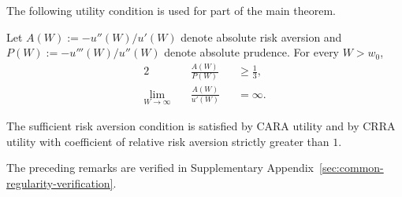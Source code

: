 The following utility condition is used for part of the main theorem.

\begin{condition}
\label{condition:sufficient-risk-aversion}
Let $A(W):=-u''(W)/u'(W)$ denote absolute risk aversion and
$P(W):=-u'''(W)/u''(W)$ denote absolute prudence.  For every $W>w_0$,
\begin{alignat}{2}
    &\frac{A(W)}{P(W)}
    &&\geq \frac{1}{3},
    \tag{U1}\label{condition:U1}\\
    \lim_{W\to\infty}\quad&\frac{A(W)}{u'(W)}
    &&=\infty.
    \tag{U2}\label{condition:U2}
\end{alignat}
\end{condition}

\begin{remark}
The sufficient risk aversion condition is satisfied by CARA utility and by CRRA utility with coefficient of relative risk aversion strictly greater than $1$.
\end{remark}

The preceding remarks are verified in Supplementary Appendix~\ref{sec:common-regularity-verification}.
